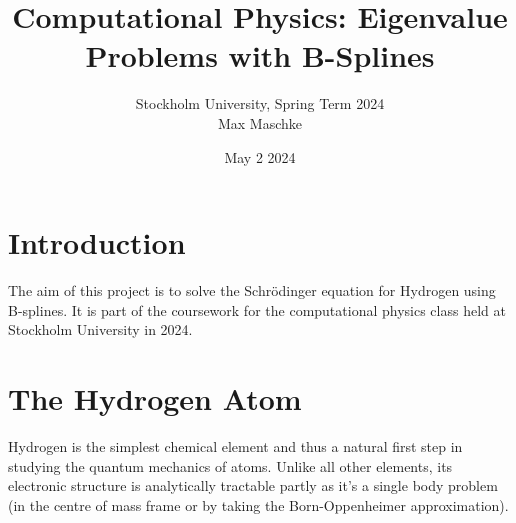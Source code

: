 \documentclass[a4paper,DIV=12,english]{scrartcl}
\title{Computational Physics: Eigenvalue Problems with B-Splines}
\author{Stockholm University, Spring Term 2024 \\Max Maschke}
\date{May 2 2024}
\begin{document}
\maketitle


\tableofcontents
\newpage


\newpage
\section{Introduction}
The aim of this project is to solve the Schrödinger equation for Hydrogen using B-splines. It is part of the coursework for the computational physics class held at Stockholm University in 2024.

\section{The Hydrogen Atom}
Hydrogen is the simplest chemical element and thus a natural first step in studying the quantum mechanics of atoms. Unlike all other elements, its electronic structure is analytically tractable partly as it's a single body problem (in the centre of mass frame or by taking the Born-Oppenheimer approximation).
\end{document}
